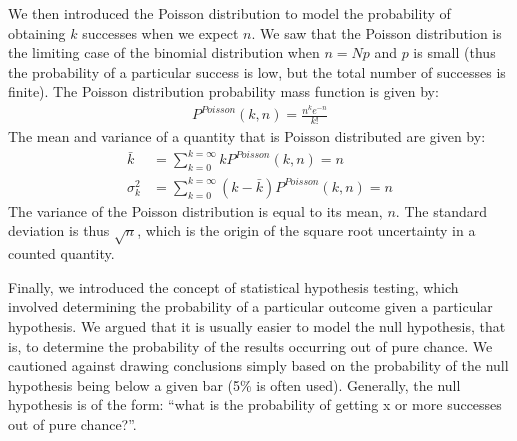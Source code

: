 We then introduced the Poisson distribution to model the probability of obtaining $k$ successes when we expect $n$. We saw that the Poisson distribution is the limiting case of the binomial distribution when $n=Np$ and $p$ is small (thus the probability of a particular success is low, but the total number of successes is finite). The Poisson distribution probability mass function is given by:
\begin{align*}
 P^{Poisson}(k,n)=\frac{n^k e^{-n}}{k!} 
\end{align*}  
The mean and variance of a quantity that is Poisson distributed are given by:
\begin{align}
\bar k &= \sum_{k=0}^{k=\infty}kP^{Poisson}(k,n)=n\\
\sigma_k^2 &= \sum_{k=0}^{k=\infty}(k-\bar k)P^{Poisson}(k,n)=n
\end{align}
The variance of the Poisson distribution is equal to its mean, $n$. The standard deviation is thus $\sqrt{n}$, which is the origin of the square root uncertainty in a counted quantity.

Finally, we introduced the concept of statistical hypothesis testing, which involved determining the probability of a particular outcome given a particular hypothesis. We argued that it is usually easier to model the null hypothesis, that is, to determine the probability of the results occurring out of pure chance. We cautioned against drawing conclusions simply based on the probability of the null hypothesis being below a given bar (5\% is often used). Generally, the null hypothesis is of the form: ``what is the probability of getting x or more successes out of pure chance?''.